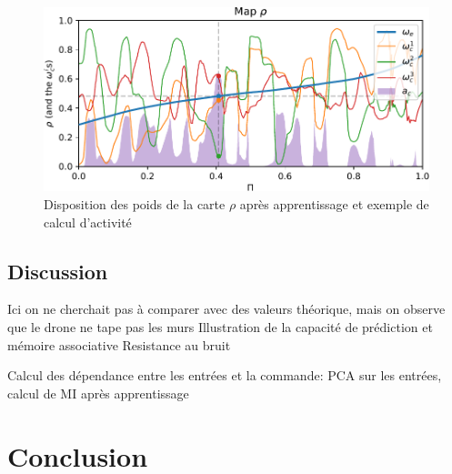 \begin{figure}
\includegraphics[width=\textwidth]{dronemap}
\caption{Disposition des poids de la carte $\rho$ après apprentissage et exemple de calcul d'activité}
\label{fig:drone_w}
\end{figure}

\subsection{Discussion}
Ici on ne cherchait pas à comparer avec des valeurs théorique, mais on observe que le drone ne tape pas les murs
Illustration de la capacité de prédiction et mémoire associative
Resistance au bruit

Calcul des dépendance entre les entrées et la commande:
PCA sur les entrées, calcul de MI après apprentissage
\section{Conclusion}





